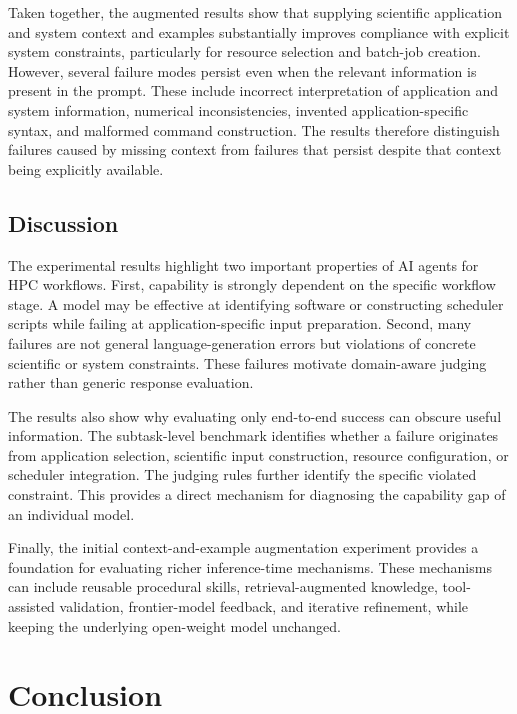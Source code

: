 \documentclass[conference]{IEEEtran}
\begin{document}
Taken together, the augmented results show that supplying scientific application and system context and examples substantially improves compliance with explicit system constraints, particularly for resource selection and batch-job creation. However, several failure modes persist even when the relevant information is present in the prompt. These include incorrect interpretation of application and system information, numerical inconsistencies, invented application-specific syntax, and malformed command construction. The results therefore distinguish failures caused by missing context from failures that persist despite that context being explicitly available.
 
\subsection{Discussion}
The experimental results highlight two important properties of AI agents for HPC workflows. First, capability is strongly dependent on the specific workflow stage. A model may be effective at identifying software or constructing scheduler scripts while failing at application-specific input preparation. Second, many failures are not general language-generation errors but violations of concrete scientific or system constraints. These failures motivate domain-aware judging rather than generic response evaluation.
 
The results also show why evaluating only end-to-end success can obscure useful information. The subtask-level benchmark identifies whether a failure originates from application selection, scientific input construction, resource configuration, or scheduler integration. The judging rules further identify the specific violated constraint. This provides a direct mechanism for diagnosing the capability gap of an individual model.
 
Finally, the initial context-and-example augmentation experiment provides a foundation for evaluating richer inference-time mechanisms. These mechanisms can include reusable procedural skills, retrieval-augmented knowledge, tool-assisted validation, frontier-model feedback, and iterative refinement, while keeping the underlying open-weight model unchanged.

\section{Conclusion}\label{sec}
\end{document}
